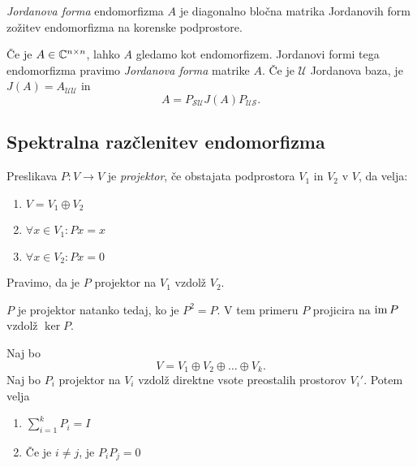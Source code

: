 \documentclass[12pt, a4paper]{article}
\begin{document}
\begin{definicija}
\emph{Jordanova forma} endomorfizma $A$ je diagonalno bločna matrika Jordanovih form zožitev endomorfizma na korenske podprostore.
\end{definicija}

\begin{opomba}
Če je $A\in\mathbb{C}^{n\times n}$, lahko $A$ gledamo kot endomorfizem. Jordanovi formi tega endomorfizma pravimo \emph{Jordanova forma} matrike $A$. Če je $\mathcal{U}$ Jordanova baza, je $J(A)=A_{\mathcal{UU}}$ in
\[
A=P_{\mathcal{SU}}J(A)P_{\mathcal{US}}.
\]
\end{opomba}

\newpage

\subsection{Spektralna razčlenitev endomorfizma}

\begin{definicija}
Preslikava $P\colon V\to V$ je \emph{projektor}, če obstajata podprostora $V_1$ in $V_2$ v $V$, da velja:

\begin{enumerate}[label=\arabic*)]
\item $V=V_1\oplus V_2$
\item $\forall x\in V_1\colon Px=x$
\item $\forall x\in V_2\colon Px=0$
\end{enumerate}

Pravimo, da je $P$ projektor na $V_1$ vzdolž $V_2$.
\end{definicija}

\begin{trditev}
$P$ je projektor natanko tedaj, ko je $P^2=P$. V tem primeru $P$ projicira na $\operatorname{im} P$ vzdolž $\ker P$.
\end{trditev}

\obvs

\begin{trditev}
Naj bo
\[
V=V_1\oplus V_2\oplus\dots\oplus V_k.
\]
Naj bo $P_i$ projektor na $V_i$ vzdolž direktne vsote preostalih prostorov $V_i'$. Potem velja

\begin{enumerate}[label=\arabic*)]
\item $\displaystyle\sum_{i=1}^k P_i=I$
\item Če je $i\ne j$, je $P_iP_j=0$
\end{enumerate}
\end{trditev}
\end{document}
